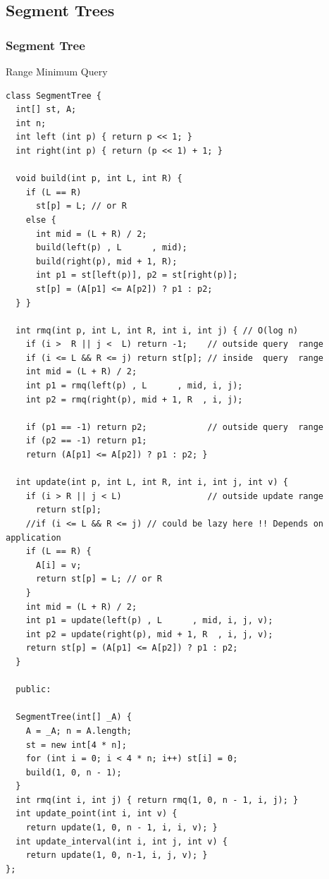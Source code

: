 \documentclass[10pt,svgnames,usenames,table]{beamer} %
\begin{document}
\subsection{Segment Trees}
\begin{frame}
  \frametitle{Segment Tree}
  Range Minimum Query
  \begin{lstlisting}
class SegmentTree {
  int[] st, A;
  int n;
  int left (int p) { return p << 1; }
  int right(int p) { return (p << 1) + 1; }

  void build(int p, int L, int R) {
    if (L == R)
      st[p] = L; // or R
    else {
      int mid = (L + R) / 2;
      build(left(p) , L      , mid);
      build(right(p), mid + 1, R);
      int p1 = st[left(p)], p2 = st[right(p)];
      st[p] = (A[p1] <= A[p2]) ? p1 : p2;
  } }

  int rmq(int p, int L, int R, int i, int j) { // O(log n)
    if (i >  R || j <  L) return -1;    // outside query  range
    if (i <= L && R <= j) return st[p]; // inside  query  range
    int mid = (L + R) / 2;
    int p1 = rmq(left(p) , L      , mid, i, j);
    int p2 = rmq(right(p), mid + 1, R  , i, j);

    if (p1 == -1) return p2;            // outside query  range
    if (p2 == -1) return p1;
    return (A[p1] <= A[p2]) ? p1 : p2; }

  int update(int p, int L, int R, int i, int j, int v) {
    if (i > R || j < L)                 // outside update range
      return st[p];
    //if (i <= L && R <= j) // could be lazy here !! Depends on application
    if (L == R) {
      A[i] = v;
      return st[p] = L; // or R
    }
    int mid = (L + R) / 2;
    int p1 = update(left(p) , L      , mid, i, j, v);
    int p2 = update(right(p), mid + 1, R  , i, j, v);
    return st[p] = (A[p1] <= A[p2]) ? p1 : p2;
  }

  public:

  SegmentTree(int[] _A) {
    A = _A; n = A.length;
    st = new int[4 * n];
    for (int i = 0; i < 4 * n; i++) st[i] = 0;
    build(1, 0, n - 1);
  }
  int rmq(int i, int j) { return rmq(1, 0, n - 1, i, j); }
  int update_point(int i, int v) {
    return update(1, 0, n - 1, i, i, v); }
  int update_interval(int i, int j, int v) {
    return update(1, 0, n-1, i, j, v); }
};
  \end{lstlisting}
\end{frame}
\end{document}
